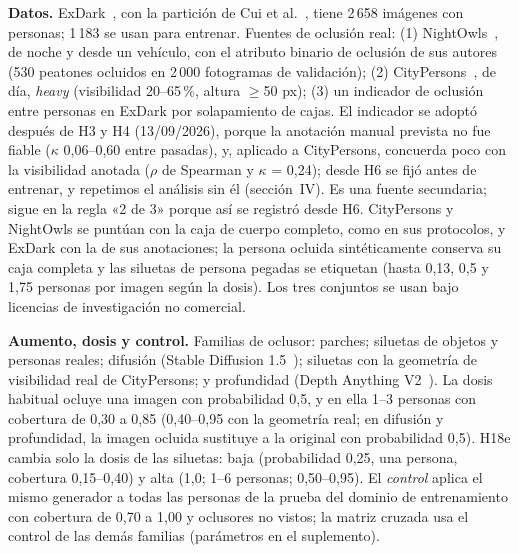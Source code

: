 \documentclass[conference]{IEEEtran}
\begin{document}
\textbf{Datos.} ExDark~\cite{Loh2019}, con la partición de Cui et al.~\cite{Cui2021}, tiene 2\,658 imágenes con personas; 1\,183 se usan para entrenar. Fuentes de oclusión real: (1) NightOwls~\cite{Neumann2019}, de noche y desde un vehículo, con el atributo binario de oclusión de sus autores (530 peatones ocluidos en 2\,000 fotogramas de validación); (2) CityPersons~\cite{Zhang2017}, de día, \emph{heavy} (visibilidad 20--65\,\%, altura $\geq$50 px); (3) un indicador de oclusión entre personas en ExDark por solapamiento de cajas. El indicador se adoptó después de H3 y H4 (13/09/2026), porque la anotación manual prevista no fue fiable ($\kappa$ 0,06--0,60 entre pasadas), y, aplicado a CityPersons, concuerda poco con la visibilidad anotada ($\rho$ de Spearman y $\kappa$ = 0,24); desde H6 se fijó antes de entrenar, y repetimos el análisis sin él (sección~IV). Es una fuente secundaria; sigue en la regla «2 de 3» porque así se registró desde H6. CityPersons y NightOwls se puntúan con la caja de cuerpo completo, como en sus protocolos, y ExDark con la de sus anotaciones; la persona ocluida sintéticamente conserva su caja completa y las siluetas de persona pegadas se etiquetan (hasta 0,13, 0,5 y 1,75 personas por imagen según la dosis). Los tres conjuntos se usan bajo licencias de investigación no comercial.

\textbf{Aumento, dosis y control.} Familias de oclusor: parches; siluetas de objetos y personas reales; difusión (Stable Diffusion 1.5~\cite{Rombach2022ldm}); siluetas con la geometría de visibilidad real de CityPersons; y profundidad (Depth Anything V2~\cite{Yang2024depthv2}). La dosis habitual ocluye una imagen con probabilidad 0,5, y en ella 1--3 personas con cobertura de 0,30 a 0,85 (0,40--0,95 con la geometría real; en difusión y profundidad, la imagen ocluida sustituye a la original con probabilidad 0,5). H18e cambia solo la dosis de las siluetas: baja (probabilidad 0,25, una persona, cobertura 0,15--0,40) y alta (1,0; 1--6 personas; 0,50--0,95). El \emph{control} aplica el mismo generador a todas las personas de la prueba del dominio de entrenamiento con cobertura de 0,70 a 1,00 y oclusores no vistos; la matriz cruzada usa el control de las demás familias (parámetros en el suplemento).
\end{document}
